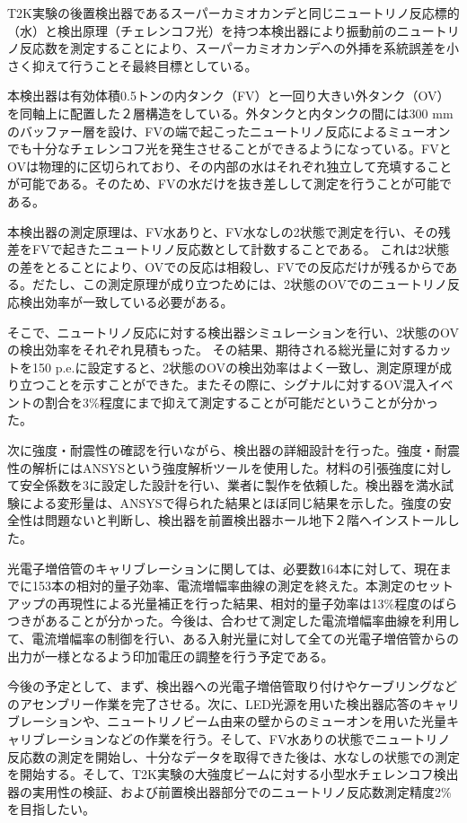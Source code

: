 \documentclass[11pt]{jreport}
\begin{document}
T2K実験の後置検出器であるスーパーカミオカンデと同じニュートリノ反応標的（水）と検出原理（チェレンコフ光）を持つ本検出器により振動前のニュートリノ反応数を測定することにより、スーパーカミオカンデへの外挿を系統誤差を小さく抑えて行うことそ最終目標としている。

本検出器は有効体積0.5トンの内タンク（FV）と一回り大きい外タンク（OV）を同軸上に配置した２層構造をしている。外タンクと内タンクの間には300 mmのバッファー層を設け、FVの端で起こったニュートリノ反応によるミューオンでも十分なチェレンコフ光を発生させることができるようになっている。FVとOVは物理的に区切られており、その内部の水はそれぞれ独立して充填することが可能である。そのため、FVの水だけを抜き差しして測定を行うことが可能である。

本検出器の測定原理は、FV水ありと、FV水なしの2状態で測定を行い、その残差をFVで起きたニュートリノ反応数として計数することである。
これは2状態の差をとることにより、OVでの反応は相殺し、FVでの反応だけが残るからである。だたし、この測定原理が成り立つためには、2状態のOVでのニュートリノ反応検出効率が一致している必要がある。

そこで、ニュートリノ反応に対する検出器シミュレーションを行い、2状態のOVの検出効率をそれぞれ見積もった。
その結果、期待される総光量に対するカットを150 p.e.に設定すると、2状態のOVの検出効率はよく一致し、測定原理が成り立つことを示すことができた。またその際に、シグナルに対するOV混入イベントの割合を3\%程度にまで抑えて測定することが可能だということが分かった。

次に強度・耐震性の確認を行いながら、検出器の詳細設計を行った。強度・耐震性の解析にはANSYSという強度解析ツールを使用した。材料の引張強度に対して安全係数を3に設定した設計を行い、業者に製作を依頼した。検出器を満水試験による変形量は、ANSYSで得られた結果とほぼ同じ結果を示した。強度の安全性は問題ないと判断し、検出器を前置検出器ホール地下２階へインストールした。

光電子増倍管のキャリブレーションに関しては、必要数164本に対して、現在までに153本の相対的量子効率、電流増幅率曲線の測定を終えた。本測定のセットアップの再現性による光量補正を行った結果、相対的量子効率は13\%程度のばらつきがあることが分かった。今後は、合わせて測定した電流増幅率曲線を利用して、電流増幅率の制御を行い、ある入射光量に対して全ての光電子増倍管からの出力が一様となるよう印加電圧の調整を行う予定である。


今後の予定として、まず、検出器への光電子増倍管取り付けやケーブリングなどのアセンブリー作業を完了させる。次に、LED光源を用いた検出器応答のキャリブレーションや、ニュートリノビーム由来の壁からのミューオンを用いた光量キャリブレーションなどの作業を行う。そして、FV水ありの状態でニュートリノ反応数の測定を開始し、十分なデータを取得できた後は、水なしの状態での測定を開始する。そして、T2K実験の大強度ビームに対する小型水チェレンコフ検出器の実用性の検証、および前置検出器部分でのニュートリノ反応数測定精度2\%を目指したい。
\end{document}
